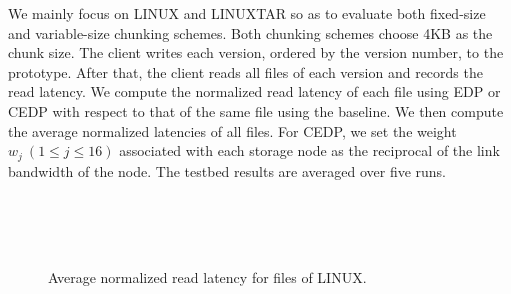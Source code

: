 
We mainly focus on LINUX and LINUXTAR so as to evaluate both
fixed-size and variable-size chunking schemes.  Both chunking schemes choose
4KB as the chunk size.  The client writes each version, ordered by the version
number, to the prototype.   After that, the client reads all files of each
version and records the read latency.  We compute the normalized read latency
of each file using EDP or CEDP with respect to that of the same file using the
baseline.  We then compute the average normalized latencies of all files.  For
CEDP, we set the weight $w_j~(1\le j \le 16)$ associated with each storage
node as the reciprocal of the link bandwidth of the node.  The testbed results
are averaged over five runs.

\begin{figure}[H]
\centering
{}
\\
\\
\\
\vspace{-6pt}
\caption{Average normalized read latency for files of LINUX.}
\end{figure}

